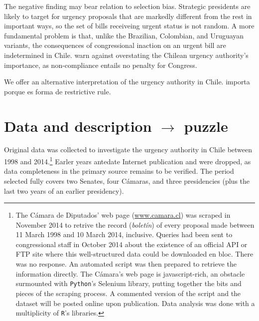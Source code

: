 \documentclass[letter,12pt]{article}
\begin{document}
The negative finding may bear relation to selection bias. Strategic presidents are likely to target for urgency proposals that are markedly different from the rest in important ways, so the set of bills receiveing urgent status is not random. A more fundamental problem is that, unlike the Brazilian, Colombian, and Uruguayan variants, the consequences of congressional inaction on an urgent bill are indetermined in Chile. \citet{berrios.gamboa.fiscChile.2006} warn against overstating the Chilean urgency authority's importance, as non-compliance entails no penalty for Congress. 

We offer an alternative interpretation of the urgency authority in Chile. importa porque es forma de restrictive rule. 

\section{Data and description $\rightarrow$ puzzle}

Original data was collected to investigate the urgency authority in Chile between 1998 and 2014.\footnote{The C\'amara de Diputados' web page (\url{www.camara.cl}) was scraped in November 2014 to retrive the record (\emph{bolet\'in}) of every proposal made between 11 March 1998 and 10 March 2014, inclusive. Queries had been sent to congressional staff in October 2014 about the existence of an official API or FTP site where this well-structured data could be downloaded en bloc. There was no response. An automated script was then prepared to retrieve the information directly. The C\'amara's web page is javascript-rich, an obstacle surmounted with \texttt{Python}'s Selenium library, putting together the bits and pieces of the scraping process. A commented version of the script and the dataset will be posted online upon publication. Data analysis was done with a multiplicity of \texttt{R}'s libraries.} Earler years antedate Internet publication and were dropped, as data completeness in the primary source remains to be verified. The period selected fully covers two Senates, four C\'amaras, and three presidencies (plus the last two years of an earlier presidency). 
\end{document}
